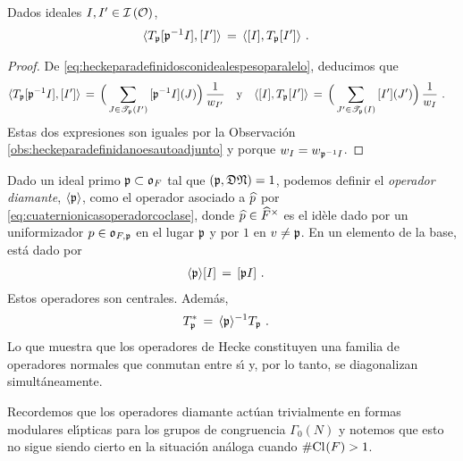 \begin{propoHeckeParaDefinidaNoEsAutoadjunto}
	\label{propo:heckeparadefinidanoesautoadjunto}
	Dados ideales $I,I'\in\ideales{\cal O}$,
	\begin{align*}
		\langle T_{\frak p}[\frak p^{-1}I],[I']\rangle & \,=\,
			\langle [I],T_{\frak p}[I']\rangle
		\text{ .}
	\end{align*}
\end{propoHeckeParaDefinidaNoEsAutoadjunto}

\begin{proof}
	De \eqref{eq:heckeparadefinidosconidealespesoparalelo}, deducimos que
	\begin{align*}
		\langle T_{\frak p}[\frak p^{-1}I],[I']\rangle \,=\,\Big(
			\sum_{J\in\mathscr T_{\frak p}(I')}\,[\frak p^{-1}I](J)
				\Big)\,\frac{1}{w_{I'}} & \quad\text{y}\quad
		\langle [I],T_{\frak p}[I']\rangle \,=\,
			\Big(\sum_{J'\in\mathscr T_{\frak p}(I)}\,
				[I'](J')\Big)\,\frac{1}{w_{I}}
		\text{ .}
	\end{align*}
	Estas dos expresiones son iguales por la Observaci\'{o}n~%
	\ref{obs:heckeparadefinidanoesautoadjunto} y porque
	$w_I=w_{\frak p^{-1}I}$.
\end{proof}

Dado un ideal primo $\frak{p}\subset\oka{F}$ tal que
$(\frak{p},\frak{D}\frak{N})=1$, podemos definir el \emph{operador diamante},
$\diamante{\frak p}$, como el operador asociado a $\hhat{p}$ por
\eqref{eq:cuaternionicasoperadorcoclase}, donde $\hhat{p}\in\Idfin{F}$ es el
id\`{e}le dado por un uniformizador $p\in\oka{F,\frak{p}}$ en el lugar
$\frak{p}$ y por $1$ en $v\not=\frak{p}$. En un elemento de la base, est\'{a}
dado por
\begin{align*}
	\diamante{\frak{p}} [I] & \,=\, [\frak{p}I]
	\text{ .}
\end{align*}
%
Estos operadores son centrales. Adem\'{a}s,
\begin{align*}
	T_{\frak{p}}^{*} & \,=\, \diamante{\frak{p}}^{-1}T_{\frak{p}}
	\text{ .}
\end{align*}
%
Lo que muestra que los operadores de Hecke constituyen una familia de
operadores normales que conmutan entre s\'{\i} y, por lo tanto, se diagonalizan
simult\'{a}neamente.

\begin{obsDiamanteParaDefinidos}\label{obs:diamanteparadefinidos}
	Recordemos que los operadores diamante act\'{u}an trivialmente en
	formas modulares el\'{\i}pticas para los grupos de congruencia
	$\Gamma_{0}(N)$ y notemos que esto no sigue siendo cierto en la
	situaci\'{o}n an\'{a}loga cuando $\#\Class{F}>1$.
\end{obsDiamanteParaDefinidos}

